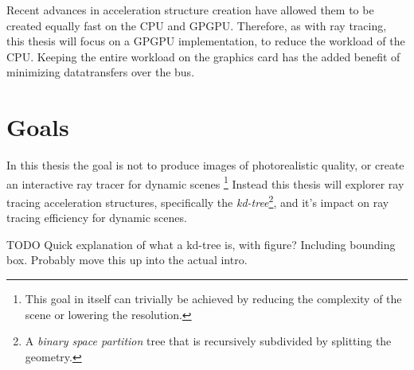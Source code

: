 Recent advances in acceleration structure creation have allowed them
to be created equally fast on the CPU and
GPGPU. Therefore, as with ray tracing, this thesis
will focus on a GPGPU implementation, to reduce the workload of the
CPU. Keeping the entire workload on the graphics card has the added
benefit of minimizing datatransfers over the bus.









\section{Goals}

In this thesis the goal is not to produce images of photorealistic
quality, or create an interactive ray tracer for dynamic
scenes \footnote{This goal in itself can trivially be achieved by
  reducing the complexity of the scene or lowering the resolution.}
Instead this thesis will explorer ray tracing acceleration structures,
specifically the \textit{kd-tree}\footnote{A \textit{binary space
    partition} tree that is recursively subdivided by splitting the
  geometry.}, and it's impact on ray tracing efficiency for dynamic
scenes.

TODO Quick explanation of what a kd-tree is, with figure? Including
bounding box. Probably move this up into the actual intro.

